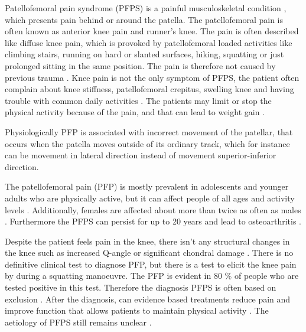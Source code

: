Patellofemoral pain syndrome (PFPS) is a painful musculoskeletal condition \citep{Maclachlan2017, Smith2015}, which presents pain behind or around the patella. The patellofemoral pain is often known as anterior knee pain and runner’s knee. The pain is often described like diffuse knee pain, which is provoked by patellofemoral loaded activities like climbing stairs, running on hard or slanted surfaces, hiking, squatting or just prolonged sitting in the same position.\citep{Crossley2016, Crossley2015, Smith2015, Boudreau2017} The pain is therefore not caused by previous trauma \citep{Crossley2016}.
Knee pain is not the only symptom of PFPS, the patient often complain about knee stiffness, patellofemoral crepitus, swelling knee and having trouble with common daily activities \citep{Martini2012, Crossley2016}. The patients may limit or stop the physical activity because of the pain, and that can lead to weight gain \citep{Petersen2013, Crossley2016}.

Physiologically PFP is associated with incorrect movement of the patellar, that occurs when the patella moves outside of its ordinary track, which for instance can be movement in lateral direction instead of movement superior-inferior direction.\citep{Martini2012}

The patellofemoral pain (PFP) is mostly prevalent in adolescents and younger adults who are physically active, but it can affect people of all ages and activity levels \citep{Crossley2016, Maclachlan2017, Crossley2015}. Additionally,  females are affected about more than twice as often as males \citep{Petersen2013}. Furthermore the PFPS can persist for up to 20 years and lead to osteoarthritis \citep{Petersen2013, Crossley2016}.

Despite the patient feels pain in the knee, there isn’t any structural changes in the knee such as increased Q-angle or significant chondral damage \citep{Petersen2013}. There is no definitive clinical test to diagnose PFP, but there is a test to elicit the knee pain by during a squatting manoeuvre. The PFP is evident in 80 \% of people who are tested positive in this test.\citep{Crossley2016, Crossley2015} Therefore the diagnosis PFPS is often based on exclusion \citep{Petersen2013}. After the diagnosis, can evidence based treatments reduce pain and improve function that allows patients to maintain physical activity \citep{Crossley2015}.
The aetiology of PFPS still remains unclear \citep{Smith2015}.
